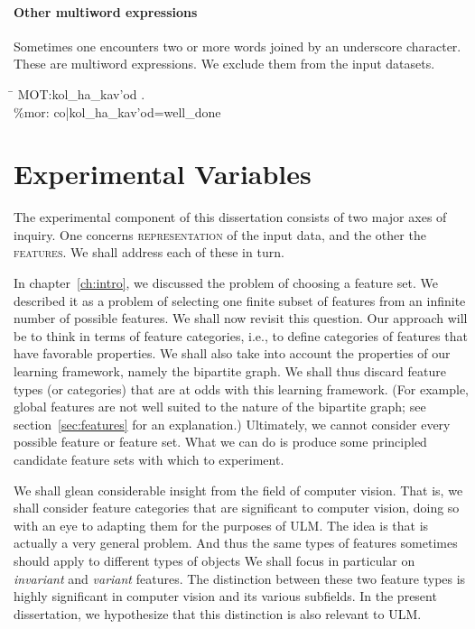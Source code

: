 \paragraph{Other multiword expressions} Sometimes one encounters two or more words joined 
by an underscore character. These are multiword expressions. We exclude them from
the input datasets. 
\begin{exe}
\ex \begin{tabbing}
\hspace{0.6in} \= \hspace{5.5in} \kill
\textsf{\*MOT:}\>\textsf{kol\_ha\_kav\a'{o}d .} \\
\textsf{\%mor:} \> \textsf{co|kol\_ha\_kav\a'{o}d=well\_done}
\end{tabbing}
\end{exe}


\section{Experimental Variables}\label{sec:expvars}
The experimental component of this dissertation consists of two major axes of inquiry. 
One concerns \textsc{representation} of the input data, and the other the \textsc{features}. 
We shall address each of these in turn. 

In chapter~\ref{ch:intro}, we discussed the problem of choosing a feature set. 
We described it as a problem of selecting one finite subset of 
features from an infinite number of possible features.
We shall now revisit this question. Our approach 
will be to think in terms of feature categories, i.e., to define categories of 
features that have favorable properties. We shall also take into account 
the properties of our learning framework, namely the bipartite graph. We shall thus discard feature types 
(or categories) that are at odds with this learning framework. (For example, global features are not well suited to
the nature of the bipartite graph; see section~\ref{sec:features} for an explanation.)
Ultimately, we cannot consider every 
possible feature or feature set. What we can do is produce some 
principled candidate feature sets with which to experiment. 

We shall glean considerable insight from the field of computer vision. 
That is, we shall consider feature 
categories that are significant to computer vision, doing so with an 
eye to adapting them for the purposes of \ac{ULM}. The idea is that 
is actually a very general problem. And thus the same types of features 
sometimes should apply to different types of objects
We shall focus in particular on \emph{invariant} and \emph{variant} 
features. The distinction between these two feature types is highly significant in
computer vision and its various subfields. In the present dissertation, 
we hypothesize that this distinction is also relevant to ULM. 

